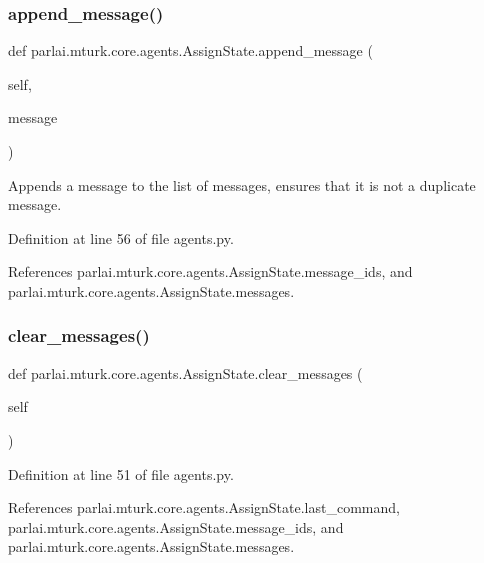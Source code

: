 \subsubsection{\texorpdfstring{append\+\_\+message()}{append\_message()}}
{\footnotesize\ttfamily def parlai.\+mturk.\+core.\+agents.\+Assign\+State.\+append\+\_\+message (\begin{DoxyParamCaption}\item[{}]{self,  }\item[{}]{message }\end{DoxyParamCaption})}

\begin{DoxyVerb}Appends a message to the list of messages, ensures that it is
not a duplicate message.
\end{DoxyVerb}
 

Definition at line 56 of file agents.\+py.



References parlai.\+mturk.\+core.\+agents.\+Assign\+State.\+message\+\_\+ids, and parlai.\+mturk.\+core.\+agents.\+Assign\+State.\+messages.

\mbox{\label{classparlai_1_1mturk_1_1core_1_1agents_1_1AssignState_a6a683e69e6ba2fc0db6570a7af70d1c0}} 
\subsubsection{\texorpdfstring{clear\+\_\+messages()}{clear\_messages()}}
{\footnotesize\ttfamily def parlai.\+mturk.\+core.\+agents.\+Assign\+State.\+clear\+\_\+messages (\begin{DoxyParamCaption}\item[{}]{self }\end{DoxyParamCaption})}



Definition at line 51 of file agents.\+py.



References parlai.\+mturk.\+core.\+agents.\+Assign\+State.\+last\+\_\+command, parlai.\+mturk.\+core.\+agents.\+Assign\+State.\+message\+\_\+ids, and parlai.\+mturk.\+core.\+agents.\+Assign\+State.\+messages.


